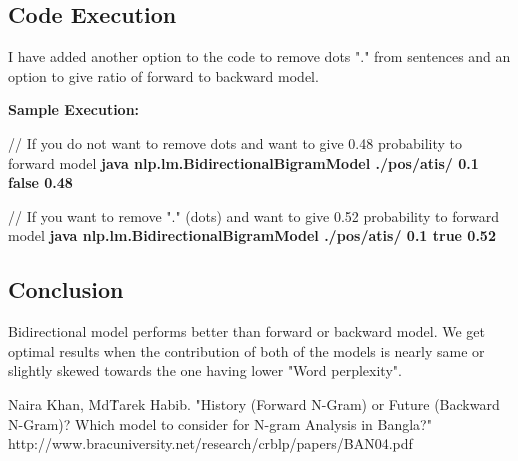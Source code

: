 \subsection{Code Execution}

I have added another option to the code to remove dots "." from sentences and an option to give ratio of forward to backward model. 

{\bfseries Sample Execution:}

// If you do not want to remove dots and want to give 0.48 probability to forward model
\newline
{\bfseries java nlp.lm.BidirectionalBigramModel ./pos/atis/ 0.1 false 0.48}


// If you want to remove "." (dots) and want to give 0.52 probability to forward model
\newline
{\bfseries java nlp.lm.BidirectionalBigramModel ./pos/atis/ 0.1 true 0.52}

\subsection{Conclusion}

Bidirectional model performs better than forward or backward model. We get optimal results when the contribution of both of the models is nearly same or slightly skewed towards the one having lower "Word perplexity".

\begin{thebibliography}{100} %

 Naira Khan, Md\. Tarek Habib. "History (Forward N-Gram) or Future (Backward N-Gram)? Which model to consider for N-gram Analysis in Bangla?" http://www.bracuniversity.net/research/crblp/papers/BAN04.pdf 

\end{thebibliography} 
